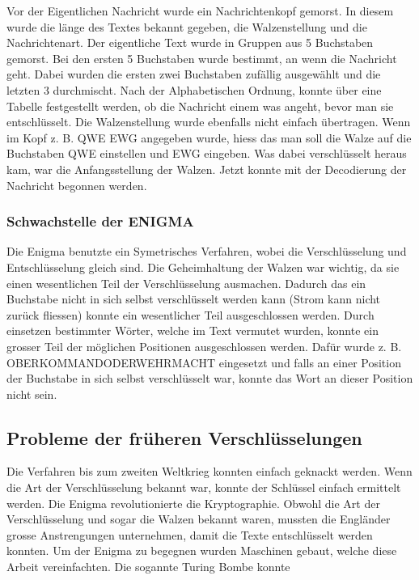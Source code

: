 Vor der Eigentlichen Nachricht wurde ein Nachrichtenkopf gemorst. In diesem wurde die länge des Textes bekannt gegeben, die Walzenstellung und die Nachrichtenart. 
Der eigentliche Text wurde in Gruppen aus 5 Buchstaben gemorst. Bei den ersten 5 Buchstaben wurde bestimmt, an wenn die Nachricht geht. Dabei wurden die ersten zwei Buchstaben zufällig ausgewählt und die letzten 3 durchmischt. Nach der Alphabetischen Ordnung, konnte über eine Tabelle festgestellt werden, ob die Nachricht einem was angeht, bevor man sie entschlüsselt.
Die Walzenstellung wurde ebenfalls nicht einfach übertragen. Wenn im Kopf z. B. QWE EWG angegeben wurde, hiess das man soll die Walze auf die Buchstaben QWE einstellen und EWG eingeben. Was dabei verschlüsselt heraus kam, war die Anfangsstellung der Walzen. Jetzt konnte mit der Decodierung der Nachricht begonnen werden.

\subsubsection{Schwachstelle der ENIGMA}
Die Enigma benutzte ein Symetrisches Verfahren, wobei die Verschlüsselung und Entschlüsselung gleich sind. %
Die Geheimhaltung der Walzen war wichtig, da sie einen wesentlichen Teil der Verschlüsselung ausmachen.
Dadurch das ein Buchstabe nicht in sich selbst verschlüsselt werden kann (Strom kann nicht zurück fliessen) konnte ein wesentlicher Teil ausgeschlossen werden.
Durch einsetzen bestimmter Wörter, welche im Text vermutet wurden, konnte ein grosser Teil der möglichen Positionen ausgeschlossen werden. Dafür wurde z. B. OBERKOMMANDODERWEHRMACHT eingesetzt und falls an einer Position der Buchstabe in sich selbst verschlüsselt war, konnte das Wort an dieser Position nicht sein.

\subsection{Probleme der früheren Verschlüsselungen}
Die Verfahren bis zum zweiten Weltkrieg konnten einfach geknackt werden. Wenn die Art der Verschlüsselung bekannt war, konnte der Schlüssel einfach ermittelt werden. 
Die Enigma revolutionierte die Kryptographie. Obwohl die Art der Verschlüsselung und sogar die Walzen bekannt waren, mussten die Engländer grosse Anstrengungen unternehmen, damit die Texte entschlüsselt werden konnten. Um der Enigma zu begegnen wurden Maschinen gebaut, welche diese Arbeit vereinfachten. Die sogannte Turing Bombe konnte 


